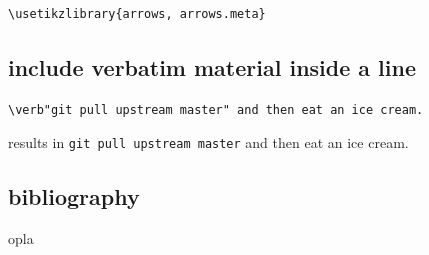 \begin{verbatim}
\usetikzlibrary{arrows, arrows.meta}
\end{verbatim}


\subsection*{include verbatim material inside a line}

\begin{verbatim}
\verb"git pull upstream master" and then eat an ice cream.
\end{verbatim}
results in
\verb"git pull upstream master" and then eat an ice cream.

\subsection*{bibliography}

opla

